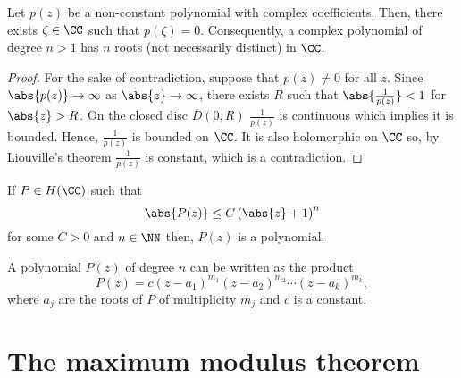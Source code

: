 \documentclass[12pt, a4paper]{article}
\begin{document}
\begin{theorem}
    Let \(p(z)\) be a non-constant polynomial with complex coefficients. Then, there exists \(\zeta \in \CC\) such that \(p(\zeta)=0\). Consequently, a complex polynomial of degree \(n>1\) has \(n\) roots (not necessarily distinct) in \(\CC\).
\end{theorem}

\begin{proof}
    For the sake of contradiction, suppose that \(p(z) \neq 0\) for all \(z\). Since \(\abs{p(z)} \to \infty\) as \(\abs{z} \to \infty\), there exists \(R\) such that \(\abs{\frac{1}{p(z)}}<1\) for \(\abs{z}>R\). On the closed disc \(\overline{D}(0,R)\) \(\frac{1}{p(z)}\) is continuous which implies it is bounded. Hence, \(\frac{1}{p(z)}\) is bounded on \(\CC\). It is also holomorphic on \(\CC\) so, by Liouville's theorem \(\frac{1}{p(z)}\) is constant, which is a contradiction.
\end{proof}

\begin{mdcor}
    If \(P \in H(\CC)\) such that
    \[\abs{P(z)}\leq C \left( \abs{z}+1 \right)^n\]
    for some \(C >0\) and \(n \in \NN\) then, \(P(z)\) is a polynomial.
\end{mdcor}


\begin{corollary}
    A polynomial \(P(z)\) of degree \(n\) can be written as the product
    \[P(z) =c(z-a_1)^{m_1}(z-a_2)^{m_2} \cdots (z-a_k)^{m_k},\]
    where \(a_j\) are the roots of \(P\) of multiplicity \(m_j\) and \(c\) is a constant.
\end{corollary}

\section{The maximum modulus theorem}
\end{document}
